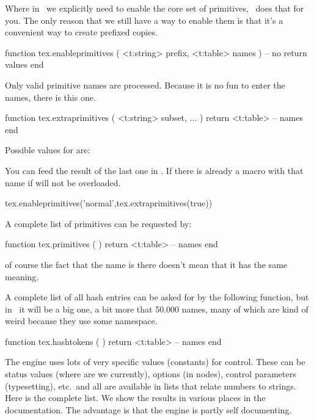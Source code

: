 \stopsubsection

\startsubsection[title={Primitives}]

Where in \LUATEX\ we explicitly need to enable the core set of primitives,
\LUAMETATEX\ does that for you. The only reason that we still have a way
to enable them is that it's a convenient way to create prefixed copies.

\starttyping[option=LUA]
function tex.enableprimitives (
    <t:string> prefix,
    <t:table>  names
)
    -- no return values
end
\stoptyping

Only valid primitive names are processed. Because it is no fun to enter the
names, there is this one.

\starttyping[option=LUA]
function tex.extraprimitives ( <t:string> subset, ... )
    return <t:table> -- names
end
\stoptyping

Possible values for  are:


You can feed the result of the last one in . If
there is already a macro with that name if will not be overloaded.

\starttyping[option=LUA]
tex.enableprimitives('normal',tex.extraprimitives(true))
\stoptyping

A complete list of primitives can be requested by:

\starttyping[option=LUA]
function tex.primitives ( )
    return <t:table> -- names
end
\stoptyping

of course the fact that the name is there doesn't mean that it has the same
meaning.

A complete list of all hash entries can be asked for by the following function, but
in \CONTEXT\ it will be a big one, a bit more that 50.000 names, many of which are
kind of weird because they use some namespace.

\starttyping[option=LUA]
function tex.hashtokens ( )
    return <t:table> -- names
end
\stoptyping

\stopsubsection

\startsubsection[title=Values (constants)]

The engine uses lots of very specific values (constants) for control. These can
be status values (where are we currently), options (in nodes), control parameters
(typesetting), etc.\ and all are available in lists that relate numbers to
strings. Here is the complete list. We show the results in various places in the
documentation. The advantage is that the engine is partly self documenting.

